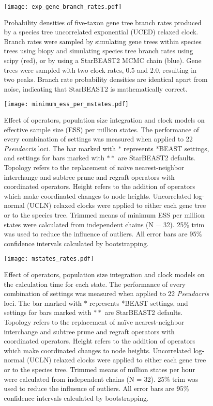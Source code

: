 \documentclass[12pt]{article}
\begin{document}
\begin{figure}[htb!]
\centering
\texttt{[image: exp\_gene\_branch\_rates.pdf]}
\caption
{Probability densities of five-taxon gene tree branch rates produced by a
species tree uncorrelated exponential (UCED) relaxed clock. Branch rates were
sampled by simulating gene trees within species trees using biopy and simulating
species tree branch rates using scipy (red), or by using a StarBEAST2 MCMC chain
(blue). Gene trees were sampled with two clock rates, 0.5 and 2.0, resulting in
two peaks. Branch rate probability densities are identical apart from noise,
indicating that StarBEAST2 is mathematically correct.}
\label{fig:geneBranchRatesUCED}
\end{figure}

\clearpage

\begin{figure}[htb!]
\centering
\texttt{[image: minimum\_ess\_per\_mstates.pdf]}
\caption
{Effect of operators, population size integration and clock models on effective
sample size (ESS) per million states. The performance of every combination of
settings was measured when applied to 22 \textit{Pseudacris} loci. The bar
marked with $\ast$ represents *BEAST settings, and settings for bars marked with
$\ast\ast$ are StarBEAST2 defaults. Topology refers to the replacement of
na\"ive nearest-neighbor interchange and subtree prune and regraft operators
with coordinated operators. Height refers to the addition of operators which
make coordinated changes to node heights. Uncorrelated log-normal (UCLN) relaxed
clocks were applied to either each gene tree or to the species tree. Trimmed
means of minimum ESS per million states were calculated from independent chains
(N = 32). 25\% trim was used to reduce the influence of outliers. All error bars
are 95\% confidence intervals calculated by bootstrapping.}
\label{fig:realEssPerMstates}
\end{figure}

\clearpage

\begin{figure}[htb!]
\centering
\texttt{[image: mstates\_rates.pdf]}
\caption
{Effect of operators, population size integration and clock models on the
calculation time for each state. The performance of every combination of
settings was measured when applied to 22 \textit{Pseudacris} loci. The bar
marked with $\ast$ represents *BEAST settings, and settings for bars marked with
$\ast\ast$ are StarBEAST2 defaults. Topology refers to the replacement of
na\"ive nearest-neighbor interchange and subtree prune and regraft operators
with coordinated operators. Height refers to the addition of operators which
make coordinated changes to node heights. Uncorrelated log-normal (UCLN) relaxed
clocks were applied to either each gene tree or to the species tree. Trimmed
means of million states per hour were calculated from independent chains (N =
32). 25\% trim was used to reduce the influence of outliers. All error bars are
95\% confidence intervals calculated by bootstrapping.}
\label{fig:mstatesPerHour}
\end{figure}
\end{document}
